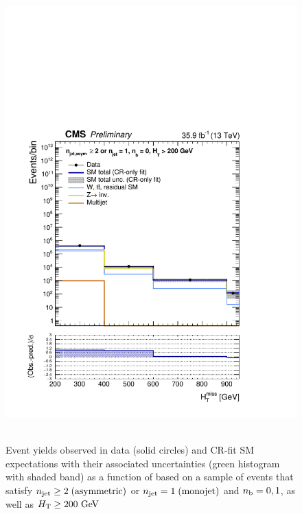 \clearpage
\begin{figure}[h!]
  \centering
  \caption{Event yields observed in data (solid circles) and CR-fit SM expectations with their associated uncertainties 
  (green histogram with shaded band) as a function of \HTmiss based on a sample of events that satisfy 
  $n_{\text{jet}} \geq 2 \; \textrm{(asymmetric)}$ or $n_{\text{jet}} = 1 \; \textrm{(monojet)}$  and $n_{\text{b}} = 0, 1$, as well as $\mbox{$H_\text{T}$} \geq 200 \textrm{ GeV}$ }
  \includegraphics[width=0.8\linewidth]{figures/results/36invfb_preapproval/aggregated/postFitShapeCR/mhtShape_eq0b_ge1j2a_200_Inf_crfit.pdf} ~
  \label{fig:aggregated_results_1}
\end{figure}

